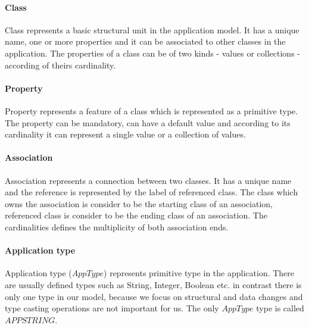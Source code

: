\documentclass[runningheads]{comsis}
\begin{document}
\paragraph{Class} Class represents a basic structural unit in the application model. It has a unique name, one or more properties and it can be associated to other classes in the application. The properties of a class can be of two kinds - values or collections - according of theirs cardinality.
	 
\paragraph{Property} Property represents a feature of a class which is represented as a primitive type. The property can be mandatory, can have a default value and according to its cardinality it can represent a single value or a collection of values. 

\paragraph {Association} Association represents a connection between two classes. It has a unique name and the reference is represented by the label of referenced class. The class which owns the association is consider to be the starting class of an association, referenced class is consider to be the ending class of an association. The cardinalities defines the multiplicity of both association ends.


\paragraph{Application type} Application type ($AppType$) represents primitive type in the application. There are usually defined types such as String, Integer, Boolean etc. in contrast there is only one type in our model, because we focus on structural and data changes and type casting operations are not important for us. The only $AppType$ type is called $APPSTRING$.

\end{document}
